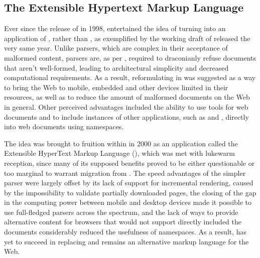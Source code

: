 \documentclass{book}
\begin{document}

      \subsection{The Extensible Hypertext Markup Language}
        Ever since the release of  in 1998, 
        entertained the idea of turning  into an application of
        , rather than , as exemplified by the working
        draft of \cite{raggett98} released the very same year. Unlike
         parsers, which are complex in their acceptance of
        malformed content,  parsers are, as per \cite[Section~1.2,
        Terminology]{bray98}, required to draconianly refuse 
        documents that aren't well-formed, leading to architectural simplicity
        and decreased computational requirements. As a result, reformulating
         in  was suggested as a way to bring the Web
        to mobile, embedded and other devices limited in their resources, as
        well as to reduce the amount of malformed documents on the Web in
        general. Other perceived advantages included the ability to use
         tools for web documents and to include instances of other
         applications, such as  and ,
        directly into web documents using  namespaces.

        The idea was brought to fruition within \cite{pemberton00} in 2000 as an
         application called the Extensible HyperText Markup
        Language (), which was met with lukewarm reception, since
        many of its supposed benefits proved to be either questionable or too
        marginal to warrant migration from .  The speed advantages
        of the simpler parser were largely offset by its lack of support for
        incremental rendering, caused by the impossibility to validate partially
        downloaded pages, the closing of the gap in the computing power between
        mobile and desktop devices made it possible to use full-fledged
         parsers across the spectrum, and the lack of ways to
        provide alternative content for browsers that would not support directly
        included the  documents considerably reduced the usefulness
        of  namespaces. As a result,  has yet to
        succeed in replacing  and remains an alternative markup
        language for the Web.
\end{document}
